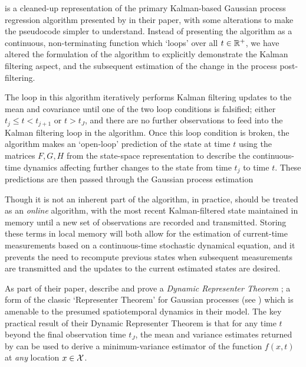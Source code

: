 \documentclass[10pt]{article}
\numberwithin{equation}{section}
\begin{document}
 is a cleaned-up representation of the primary Kalman-based Gaussian process regression algorithm presented by \citeauthor{Todescato-Efficient-2020} in their paper, with some alterations to make the pseudocode simpler to understand. Instead of presenting the algorithm as a continuous, non-terminating function which `loops' over all $t \in \mathbb{R}^{+}$, we have altered the formulation of the algorithm to explicitly demonstrate the Kalman filtering aspect, and the subsequent estimation of the change in the process post-filtering. 

The loop in this algorithm iteratively performs Kalman filtering updates to the mean and covariance until one of the two loop conditions is falsified; either $t_{j} \le t < t_{j+1}$ or $t > t_{J}$, and there are no further observations to feed into the Kalman filtering loop in the algorithm. Once this loop condition is broken, the algorithm makes an `open-loop' prediction of the state at time $t$ using the matrices $F, G, H$ from the state-space representation to describe the continuous-time dynamics affecting further changes to the state from time $t_{j}$ to time $t$. These predictions are then passed through the Gaussian process estimation 

Though it is not an inherent part of the algorithm, in practice,  should be treated as an \emph{online} algorithm, with the most recent Kalman-filtered state maintained in memory until a new set of observations are recorded and transmitted. Storing these terms in local memory will both allow for the estimation of current-time measurements based on a continuous-time stochastic dynamical equation, and it prevents the need to recompute previous states when subsequent measurements are transmitted and the updates to the current estimated states are desired.

As part of their paper, \citeauthor{Todescato-Efficient-2020} describe and prove a \emph{Dynamic Representer Theorem} ; a form of the classic `Representer Theorem' for Gaussian processes (see ) which is amenable to the presumed spatiotemporal dynamics in their model. The key  practical result of their Dynamic Representer Theorem is that for any time $t$ beyond the final observation time $t_{J}$, the mean and variance estimates returned by  can be used to derive a minimum-variance estimator of the function $f(x, t)$ at \emph{any} location $x \in \mathcal{X}$.
\end{document}
